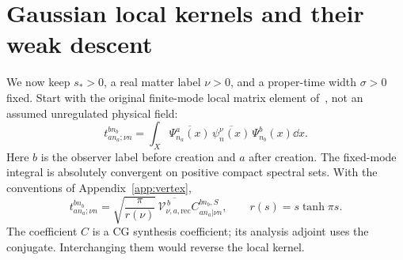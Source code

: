 \section{Gaussian local kernels and their weak descent}
\label{sec:fields}
We now keep $s_*>0$, a real matter label $\nu>0$, and a proper-time width
$\sigma>0$ fixed. Start with the original finite-mode local matrix element
of~\cite[(5.4)]{KL}, not an assumed unregulated physical field:
\begin{equation}
 t^{b n_b}_{a n_a;\nu n}
 =\int_X\overline{\Psi^a_{n_a}(x)}
       \,\overline{\psi^\nu_n(x)}\,\Psi^b_{n_b}(x)\dd x.
 \label{eq:local-mode}
\end{equation}
Here $b$ is the observer label before creation and $a$ after creation.
The fixed-mode integral is absolutely convergent on positive compact
spectral sets. With the conventions of Appendix~\ref{app:vertex},
\begin{equation}
 t^{b n_b}_{a n_a;\nu n}
 =\sqrt{\frac{\pi}{r(\nu)}}\,
   \overline{\mathcal V^{\,b}_{\nu,a,\mathrm{rec}}}
   C^{b n_b,S}_{a n_a|\nu n},\qquad r(s)=s\tanh\pi s.
\end{equation}
The coefficient $C$ is a CG synthesis coefficient; its analysis adjoint
uses the conjugate. Interchanging them would reverse the local kernel.

